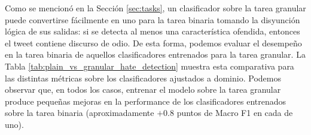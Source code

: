Como se mencionó en la Sección \ref{sec:tasks}, un clasificador sobre la tarea granular puede convertirse fácilmente en uno para la tarea binaria tomando la disyunción lógica de sus salidas: si se detecta al menos una característica ofendida, entonces el tweet contiene discurso de odio. De esta forma, podemos evaluar el desempeño en la tarea binaria de aquellos clasificadores entrenados para la tarea granular. La Tabla \ref{tab:plain_vs_granular_hate_detection} muestra esta comparativa para las distintas métricas sobre los clasificadores ajustados a dominio. Podemos observar que, en todos los casos, entrenar el modelo sobre la tarea granular produce pequeñas mejoras en la performance de los clasificadores entrenados sobre la tarea binaria (aproximadamente $+0.8$ puntos de Macro F1 en cada de uno).

